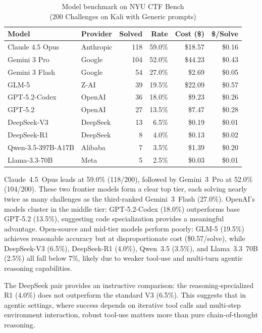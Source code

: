 \documentclass[conference]{IEEEtran}
\begin{document}
\begin{table}[htb]
\centering
\caption{Model benchmark on NYU CTF Bench \\(200 Challenges on Kali with Generic prompts)}
\label{tab:rq3_results}
\footnotesize
\begin{tabular}{@{}llrrrr@{}}
\toprule
\textbf{Model} & \textbf{Provider} & \textbf{Solved} & \textbf{Rate} & \textbf{Cost (\$)} & \textbf{\$/Solve} \\
\midrule
Claude 4.5 Opus    & Anthropic & 118 & 59.0\% & \$18.57 & \$0.16 \\
Gemini 3 Pro       & Google    & 104 & 52.0\% & \$44.23 & \$0.43 \\
Gemini 3 Flash     & Google    &  54 & 27.0\% &  \$2.69 & \$0.05 \\
GLM-5              & Z-AI      &  39 & 19.5\% & \$22.09 & \$0.57 \\
GPT-5.2-Codex      & OpenAI    &  36 & 18.0\% &  \$9.23 & \$0.26 \\
GPT-5.2            & OpenAI    &  27 & 13.5\% &  \$7.47 & \$0.28 \\
DeepSeek-V3        & DeepSeek  &  13 &  6.5\% &  \$0.19 & \$0.01 \\
DeepSeek-R1        & DeepSeek  &   8 &  4.0\% &  \$0.13 & \$0.02 \\
Qwen-3.5-397B-A17B & Alibaba   &   7 &  3.5\% &  \$1.39 & \$0.20 \\
Llama-3.3-70B      & Meta      &   5 &  2.5\% &  \$0.03 & \$0.01 \\
\bottomrule
\end{tabular}
\end{table}

Claude~4.5~Opus leads at 59.0\% (118/200), followed by Gemini~3~Pro at 52.0\% (104/200). These two frontier models form a clear top tier, each solving nearly twice as many challenges as the third-ranked Gemini~3~Flash (27.0\%). OpenAI's models cluster in the middle tier: GPT-5.2-Codex (18.0\%) outperforms base GPT-5.2 (13.5\%), suggesting code specialization provides a meaningful advantage. Open-source and mid-tier models perform poorly: GLM-5 (19.5\%) achieves reasonable accuracy but at disproportionate cost (\$0.57/solve), while DeepSeek-V3 (6.5\%), DeepSeek-R1 (4.0\%), Qwen~3.5 (3.5\%), and Llama~3.3~70B (2.5\%) all fall below 7\%, likely due to weaker tool-use and multi-turn agentic reasoning capabilities.

The DeepSeek pair provides an instructive comparison: the reasoning-specialized R1 (4.0\%) does not outperform the standard V3 (6.5\%). This suggests that in agentic settings, where success depends on iterative tool calls and multi-step environment interaction, robust tool-use matters more than pure chain-of-thought reasoning.
\end{document}
